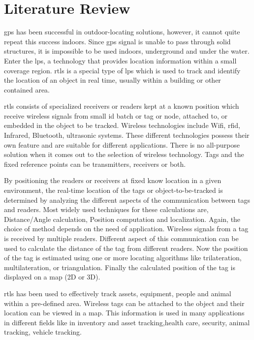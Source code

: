 \section{Literature Review}

\gls{gps} has been successful in outdoor-locating solutions, however, it cannot quite repeat this success indoors. Since \gls{gps} signal is unable to pass through solid structures, it is impossible to be used indoors, underground and under the water. Enter the \gls{lps}, a technology that provides location information within a small coverage region. \gls{rtls} is a special type of \gls{lps} which is used to track and identify the location of an object in real time, usually within a building or other contained area.

\gls{rtls} consists of specialized receivers or readers kept at a known position which receive wireless signals from small \gls{id} batch or tag or node, attached to, or embedded in the object to be tracked. Wireless technologies include Wifi, \gls{rfid}, Infrared, Bluetooth, ultrasonic systems. These different technologies possess their own feature and are suitable for different applications. There is no all-purpose solution when it comes out to the selection of wireless technology. Tags and the fixed reference points can be transmitters, receivers or both. 

By positioning the readers or receivers at fixed know location in a given environment, the real-time location of the tags or object-to-be-tracked is determined by analyzing the different aspects of the communication between tags and readers. Most widely used techniques for these calculations are, Distance/Angle calculation, Position computation and localization. Again, the choice of method depends on the need of application. Wireless signals from a tag is received by multiple readers. Different aspect of this communication can be used to calculate the distance of the tag from different readers. Now the position of the tag is estimated using one or more locating algorithms like trilateration, multilateration, or triangulation. Finally the calculated position of the tag is displayed on a map (2D or 3D).

\gls{rtls} has been used to effectively track assets, equipment, people and animal within a pre-defined area. Wireless tags can be attached to the object and their location can be viewed in a map. This information is used in many applications in different fields like in inventory and asset tracking,health care, security, animal tracking, vehicle tracking.


